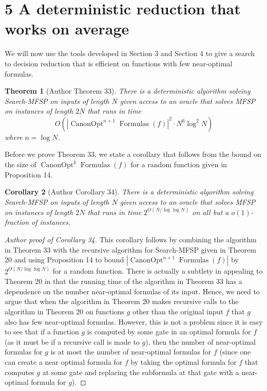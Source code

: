 \documentclass[10pt,a4paper]{article}
\newtheorem{nttheorem}{Theorem}
\newtheorem{ntcorollary}[nttheorem]{Corollary}
\newcommand{\Canon}[1]{\operatorname{CanonOpt}^{#1}\!\operatorname{Formulas}}
\begin{document}
\section*{5 A deterministic reduction that works on average}
We will now use the tools developed in Section 3 and Section 4 to give a search to decision reduction that is efficient on functions with few near-optimal formulas.
\setcounter{nttheorem}{32}
\begin{nttheorem}[Author Theorem 33]
There is a deterministic algorithm solving Search-MFSP on inputs of length $N$ given access to an oracle that solves MFSP on instances of length $2N$ that runs in time
\[O(|\Canon{n+1}(f)|^2\cdot N^6\log^2N)\]
where $n=\log N$.
\end{nttheorem}
Before we prove Theorem 33, we state a corollary that follows from the bound on the size of $\Canon{k}(f)$ for a random function given in Proposition 14.
\begin{ntcorollary}[Author Corollary 34]
There is a deterministic algorithm solving Search-MFSP on inputs of length $N$ given access to an oracle that solves MFSP on instances of length $2N$ that runs in time $2^{O(N/\log\log N)}$ on all but a $o(1)$-fraction of instances.
\end{ntcorollary}
\begin{proof}[Author proof of Corollary 34]
This corollary follows by combining the algorithm in Theorem 33 with the recursive algorithm for Search-MFSP given in Theorem 20 and using Proposition 14 to bound $|\Canon{n+1}(f)|$ by $2^{O(N/\log\log N)}$ for a random function.
There is actually a subtlety in appealing to Theorem 20 in that the running time of the algorithm in Theorem 33 has a dependence on the number near-optimal formulas of its input. Hence, we need to argue that when the algorithm in Theorem 20 makes recursive calls to the algorithm in Theorem 20 on functions $g$ other than the original input $f$ that $g$ also has few near-optimal formulas. However, this is not a problem since it is easy to see that if a function $g$ is computed by some gate in an optimal formula for $f$ (as it must be if a recursive call is made to $g$), then the number of near-optimal formulas for $g$ is at most the number of near-optimal formulas for $f$ (since one can create a near optimal formula for $f$ by taking the optimal formula for $f$ that computes $g$ at some gate and replacing the subformula at that gate with a near-optimal formula for $g$).
\end{proof}
\end{document}
